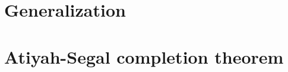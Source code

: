 \documentclass[reqno,11pt]{book}
\numberwithin{equation}{section}
\theoremstyle{plain}
\theoremstyle{plain}
\numberwithin{equation}{section}
\theoremstyle{remark}
\begin{document}
\chapter{Generalization}

\chapter{Atiyah-Segal completion theorem}


%
%
\end{document}
